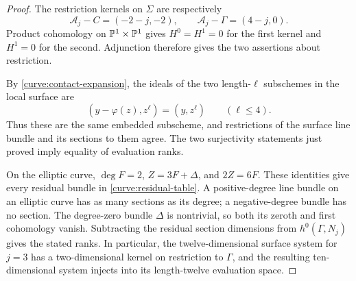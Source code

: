 \begin{proof}
The restriction kernels on $\Sigma$ are respectively
\[
 \mathcal A_j-C=(-2-j,-2),\qquad
 \mathcal A_j-\Gamma=(4-j,0).
\]
Product cohomology on $\mathbb P^1\times\mathbb P^1$ gives $H^0=H^1=0$ for
the first kernel and $H^1=0$ for the second.  Adjunction therefore
gives the two assertions about restriction.

By \eqref{curve:contact-expansion}, the ideals of the two length-$\ell$
subschemes in the local surface are
\[
 (y-\varphi(z),z^\ell)=(y,z^\ell)\qquad(\ell\le4).
\]
Thus these are the same embedded subscheme, and restrictions of the
surface line bundle and its sections to them agree.  The two
surjectivity statements just proved imply equality of evaluation ranks.

On the elliptic curve, $\deg F=2$, $Z=3F+\Delta$, and $2Z=6F$.
These identities give every residual bundle in
\eqref{curve:residual-table}.  A positive-degree line bundle on an
elliptic curve has as many sections as its degree; a negative-degree
bundle has no section.  The degree-zero bundle $\Delta$ is nontrivial,
so both its zeroth and first cohomology vanish.  Subtracting the
residual section dimensions from $h^0(\Gamma,N_j)$ gives the stated
ranks.  In particular, the twelve-dimensional surface system for
$j=3$ has a two-dimensional kernel on restriction to $\Gamma$, and
the resulting ten-dimensional system injects into its length-twelve
evaluation space.
\end{proof}

